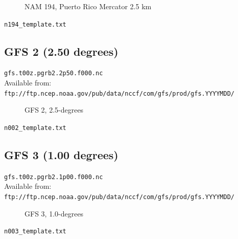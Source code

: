\documentclass[11pt]{article}   %
\begin{document}
\begin{figure}[htbp]\begin{center}
\parbox{15cm}{\caption{\label{FigNAM194}
NAM 194, Puerto Rico Mercator 2.5 km
}}
\end{center}\end{figure}
\clearpage
\verb|n194_template.txt| \\
\tiny  \normalsize
%
%

\clearpage
\subsection{GFS 2 (2.50 degrees)}

\verb|gfs.t00z.pgrb2.2p50.f000.nc|\\
Available from:\\
\verb|ftp://ftp.ncep.noaa.gov/pub/data/nccf/com/gfs/prod/gfs.YYYYMDD/|

\begin{figure}[htbp]\begin{center}
\parbox{15cm}{\caption{\label{FigNAM002}
GFS 2, 2.5-degrees
}}
\end{center}\end{figure}
\clearpage
\verb|n002_template.txt| \\
\tiny  \normalsize

\clearpage
\subsection{GFS 3 (1.00 degrees)}

\verb|gfs.t00z.pgrb2.1p00.f000.nc|\\
Available from:\\
\verb|ftp://ftp.ncep.noaa.gov/pub/data/nccf/com/gfs/prod/gfs.YYYYMDD/|

\begin{figure}[htbp]\begin{center}
\parbox{15cm}{\caption{\label{FigNAM003}
GFS 3, 1.0-degrees
}}
\end{center}\end{figure}
\clearpage
\verb|n003_template.txt| \\
\tiny  \normalsize
\end{document}
